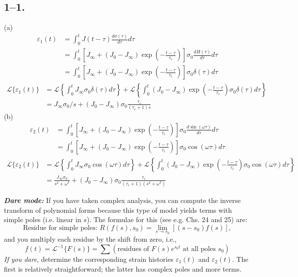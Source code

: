\subsection*{1--1.}
(a) 
\begin{align*}
\varepsilon_1(t) &= \int_0^t J(t-\tau) \frac{d\sigma(\tau)}{d\tau} d\tau \\
&= \int_0^t [J_\infty + (J_0-J_\infty)\exp(-\frac{t-\tau}{\tau_c})]\sigma_{0}\frac{dH(\tau)}{d\tau}d\tau \\
&= \int_0^t [J_\infty + (J_0-J_\infty)\exp(-\frac{t-\tau}{\tau_c})]\sigma_{0}\delta(\tau)d\tau
\end{align*}
\begin{align*}
    \mathcal{L}\{\varepsilon_1(t)\} &= \mathcal{L}\left\{\int_0^t J_\infty \sigma_0 \delta(\tau)d\tau\right\} + \mathcal{L}\left\{ \int_0^t(J_0-J_\infty)\exp(-\frac{t-\tau}{\tau_c}) \sigma_{0} \delta(\tau) d\tau\right\} \\
    &= J_\infty \sigma_0 /s + (J_0-J_\infty)\sigma_0\frac{\tau_c}{(\tau_c+1)s}
\end{align*}
(b)
\begin{align*}
    \varepsilon_2(t) 
&= \int_0^t [J_\infty + (J_0-J_\infty)\exp(-\frac{t-\tau}{\tau_c})]\sigma_{0}\frac{d\sin({\omega \tau})}{d\tau}d\tau \\
&= \int_0^t [J_\infty + (J_0-J_\infty)\exp(-\frac{t-\tau}{\tau_c})]\sigma_{0}\cos({\omega \tau})d\tau
\end{align*}
\begin{align*}
    \mathcal{L}\{\varepsilon_2(t)\} &= \mathcal{L}\left\{\int_0^t J_\infty \sigma_0 \cos({\omega \tau})d\tau\right\} + \mathcal{L}\left\{ \int_0^t(J_0-J_\infty)\exp(-\frac{t-\tau}{\tau_c}) \sigma_{0} \cos({\omega \tau}) d\tau\right\} \\
    &= \frac{J_\infty \sigma_0}{s^2 + \omega^2}  + (J_0-J_\infty)\sigma_0\frac{\tau_c}{(\tau_c+1)(s^2+\omega^2)}
\end{align*}

\textit{\textbf{Dare mode:}} If you have taken complex analysis, you can compute the inverse transform of polynomial forms because this type of model yields terms with simple poles (i.e. linear in $s$). 
The formulae for this (see e.g. \cite{rileyMathematicalMethodsPhysics2006} Chs. 24 and 25) are:
\begin{equation*}
    \textrm{Residue for simple poles: } R(f(s),s_0) = \lim\limits_{s\rightarrow s_0} \left[ (s-s_0) f(s) \right],
\end{equation*}
and you multiply each residue by the shift from zero, i.e.,
\begin{equation*}
    f(t) = \mathcal{L}^{-1}\{F(s)\} = \sum \left( \textrm{residues of } F(s)e^{s_0 t} \textrm{ at all poles } s_0 \right)
\end{equation*}
\textit{If you dare}, determine the corresponding strain histories $\varepsilon_1(t)$ and $\varepsilon_2(t)$. The first is relatively straightforward; the latter has complex poles and more terms. 

